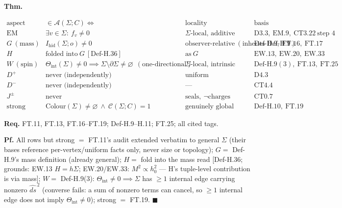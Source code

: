 \begin{theorem}\label{tag:FT-20}
\textbf{Thm.}

\[
\begin{array}{c|c|c|c}
\text{aspect} & \in\mathcal A(\Sigma;C)\iff & \text{locality} & \text{basis}\\ \hline
\mathrm{EM} & \exists v\in\Sigma:\ f_v\ne0 & \Sigma\text{-local, additive} & \mathrm{D3.3},\ \mathrm{EM.9},\ \mathrm{CT3.22}\ \text{step 4}\\
G\ (\text{mass}) & I_{\mathrm{hid}}(\Sigma;o)\ne0 & \text{observer-relative}\ (\text{inherits Def-H.9}) & \mathrm{Def\text{-}H.9},\ \mathrm{FT.16},\ \mathrm{FT.17}\\
H & \text{folded into}\ G\ [\mathrm{Def\text{-}H.36}] & \text{as}\ G & \mathrm{EW.13},\ \mathrm{EW.20},\ \mathrm{EW.33}\\
W\ (\text{spin}) & \Theta_{\mathrm{int}}(\Sigma)\ne0\implies\Sigma\setminus\partial\Sigma\ne\varnothing\ \ (\text{one-directional}) & \Sigma\text{-local, intrinsic} & \mathrm{Def\text{-}H.9}(3),\ \mathrm{FT.13},\ \mathrm{FT.25}\\
D^+ & \text{never (independently)} & \text{uniform} & \mathrm{D4.3}\\
D^- & \text{never (independently)} & — & \mathrm{CT4.4}\\
J^\pm & \text{never} & \text{seals},\ \neg\text{charges} & \mathrm{CT0.7}\\
\mathrm{strong} & \mathrm{Colour}(\Sigma)\ne\varnothing\ \wedge\ \mathcal C(\Sigma;C)=1 & \text{genuinely global} & \mathrm{Def\text{-}H.10},\ \mathrm{FT.19}
\end{array}
\]

\textbf{Req.} FT.11, FT.13, FT.16–FT.19; Def-H.9–H.11; FT.25; all cited tags.

\textbf{Pf.} All rows but strong $=$ FT.11's audit extended verbatim to general $\Sigma$ (their bases reference per-vertex/uniform facts only, never size or topology); $G=$ Def-H.9's mass definition (already general); $H=$ fold into the mass read [Def-H.36; grounds: EW.13 $H=h\Sigma$; EW.20/EW.33: $M^2\propto h_0^2$ — H's tuple-level contribution is via mass]; $W=$ Def-H.9(3): $\Theta_{\mathrm{int}}\ne0\implies\Sigma$ has $\ge1$ internal edge carrying nonzero $\widehat{ds}^{\,2}$ (converse fails: a sum of nonzero terms can cancel, so $\ge1$ internal edge does not imply $\Theta_{\mathrm{int}}\ne0$); strong $=$ FT.19. $\blacksquare$


\end{theorem}
